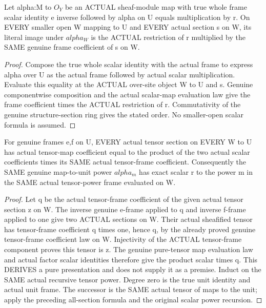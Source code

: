 \begin{lemma}
\label{lem:seven-native-negative-subopen-scalar}
\leanok
Let alpha:M to $O_Y$ be an ACTUAL sheaf-module map with true whole frame
scalar identity e inverse followed by alpha on U equals multiplication
by r. On EVERY smaller open W mapping to U and EVERY actual section s
on W, its literal image under $alpha_W$ is the ACTUAL restriction of r
multiplied by the SAME genuine frame coefficient of s on W.
\end{lemma}
\begin{proof}
Compose the true whole scalar identity with the actual frame to express
alpha over U as the actual frame followed by actual scalar multiplication.
Evaluate this equality at the ACTUAL over-site object W to U and s.
Genuine componentwise composition and the actual scalar-map evaluation
law give the frame coefficient times the ACTUAL restriction of r.
Commutativity of the genuine structure-section ring gives the stated
order. No smaller-open scalar formula is assumed.
\end{proof}

\begin{lemma}
\label{lem:seven-native-negative-subopen-tensor-powers}
\leanok
For genuine frames e,f on U, EVERY actual tensor section on EVERY
W to U has actual tensor-map coefficient equal to the product of the
two actual scalar coefficients times its SAME actual tensor-frame
coefficient. Consequently the SAME genuine map-to-unit power $alpha_m$
has exact scalar r to the power m in the SAME actual tensor-power
frame evaluated on W.
\end{lemma}
\begin{proof}
Let q be the actual tensor-frame coefficient of the given actual tensor
section z on W. The inverse genuine e-frame applied to q and inverse
f-frame applied to one give two ACTUAL sections on W. Their actual
sheafified tensor has tensor-frame coefficient q times one, hence q,
by the already proved genuine tensor-frame coefficient law on W.
Injectivity of the ACTUAL tensor-frame component proves this tensor
is z. The genuine pure-tensor map evaluation law and actual factor
scalar identities therefore give the product scalar times q. This
DERIVES a pure presentation and does not supply it as a premise.
Induct on the SAME actual recursive tensor power. Degree zero is the
true unit identity and actual unit frame. The successor is the SAME
actual tensor of maps to the unit; apply the preceding all-section
formula and the original scalar power recursion.
\end{proof}

